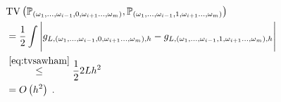 \documentclass[10pt]{article} %
\def\Ind{\mathds{1}}
\newcommand{\Prob}[0]{\mathbb{P}}
\newcommand\tv[2]{\mathrm{TV}\left( {#1}, {#2} \right)}
\newcommand\p[1]{\left( {#1}\right)}
\newcommand\RG[1]{\textcolor{red}{#1}}
\begin{document}
\begin{equation*}
\begin{aligned}
    &\tv{\Prob_{(\omega_1, \dots, \omega_{i-1}, 0, \omega_{i+1} \dots, \omega_{m})}}{\Prob_{(\omega_1, \dots, \omega_{i-1}, 1, \omega_{i+1} \dots, \omega_{m})}} \\
    &= \frac{1}{2} \int \Bigg| g_{L,  (\omega_1, \dots, \omega_{i-1}, 0, \omega_{i+1} \dots, \omega_{m}), h} -  g_{L, (\omega_1, \dots, \omega_{i-1}, 1, \omega_{i+1} \dots, \omega_{m}), h}  \Bigg| \\
    &\stackrel{\eqref{eq:tvsawham}}{\leq} \frac{1}{2} 2 L h^2  \\
    &= O \p{h^{2}}\;.
\end{aligned}  
\end{equation*}
\end{document}
